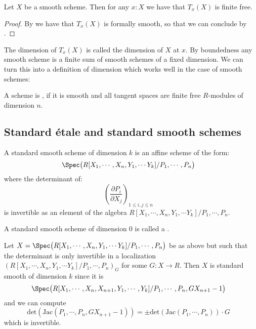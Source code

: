 \begin{proposition}\label{smooth-have-free-tangent}
Let $X$ be a smooth scheme. Then for any $x:X$ we have that $T_x(X)$ is finite free.
\end{proposition}

\begin{proof}
By  we have that $T_x(X)$ is formally smooth, so that we can conclude by .
\end{proof}

The dimension of $T_x(X)$ is called the dimension of $X$ at $x$. By boundedness any smooth scheme is a finite sum of smooth schemes of a fixed dimension.
We can turn this into a definition of dimension which works well in the case of smooth schemes:

\begin{definition}
  \label{definition-smooth-dim-n}
  A scheme is , if it is smooth and all tangent spaces are finite free $R$-modules of dimension $n$.
\end{definition}

\subsection{Standard étale and standard smooth schemes}

\begin{definition}
A standard smooth scheme of dimension $k$ is an affine scheme of the form:
\[\Spec\big(R[X_1,\cdots,X_n,Y_1,\cdots Y_{k}] / P_1,\cdots,P_n\big)\]
where the determinant of:
\[\left( \frac{\partial P_i}{\partial X_j}\right)_{1\leq i,j\leq n}\]
is invertible as an element of the algebra $R[X_1,\cdots,X_n,Y_1,\cdots Y_{k}] / P_1,\cdots,P_n$.
\end{definition}

\begin{definition}
A standard smooth scheme of dimension $0$ is called a .
\end{definition}

\begin{remark}
  \label{standard-open-in-std-smooth}
  Let $X=\Spec\big(R[X_1,\cdots,X_n,Y_1,\cdots Y_{k}] / P_1,\cdots,P_n\big)$
  be as above but such that the determinant is
  only invertible in a localization $(R[X_1,\cdots,X_n,Y_1,\cdots Y_{k}] / P_1,\cdots,P_n)_G$ for some $G:X\to R$.
  Then $X$ is standard smooth of dimension $k$ since it is
  \[ \Spec\big(R[X_1,\cdots,X_n,X_{n+1},Y_1,\cdots,Y_k] / P_1,\cdots,P_n,GX_{n+1}-1\big)\]
  and we can compute
  \[\mathrm{det}(\mathrm{Jac}(P_1,\cdots,P_n,GX_{n+1}-1)) = \pm\mathrm{det}(\mathrm{Jac}(P_1,\cdots,P_n)) \cdot G\]
  which is invertible.
\end{remark}

